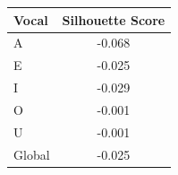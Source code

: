 \begin{tabular}{lc}
\toprule
\rowcolor{col01}
Vocal & Silhouette Score \\
\midrule
A & -0.068 \\
E & -0.025 \\
I & -0.029 \\
O & -0.001 \\
U & -0.001 \\
Global & -0.025 \\
\bottomrule
\end{tabular}
